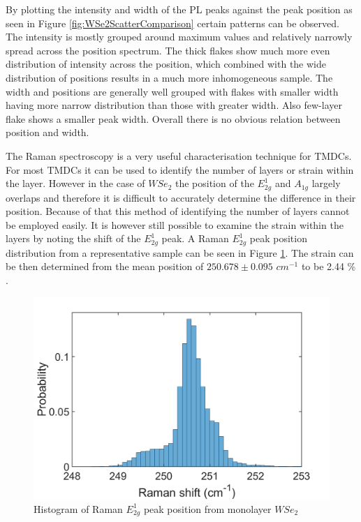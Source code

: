 By plotting the intensity and width of the PL peaks against the peak position as seen in Figure \ref{fig:WSe2ScatterComparison} certain patterns can be observed. The intensity is mostly grouped around maximum values and relatively narrowly spread across the position spectrum. The thick flakes show much more even distribution of intensity across the position, which combined with the wide distribution of positions results in a much more inhomogeneous sample.  The width and positions are generally well grouped with flakes with smaller width having more narrow distribution than those with greater width. Also few-layer flake shows a smaller peak width. Overall there is no obvious relation between position and width. 


The Raman spectroscopy is a very useful characterisation technique for TMDCs. For most TMDCs it can be used to identify the number of layers or strain within the layer. However in the case of $WSe_2$ the position of the $E^1_{2g}$ and $A_{1g}$ largely overlaps and therefore it is difficult to accurately determine the difference in their position. Because of that this method of identifying the number of layers cannot be employed easily. It is however still possible to examine the strain within the layers by noting the shift of the $E^1_{2g}$ peak. A Raman $E^1_{2g}$ peak position distribution from a representative sample can be seen in Figure \ref{fig:WSe2RamanPositionHistogram1}. The strain can be then determined from the mean position of $250.678 \pm 0.095$ $cm^{-1}$ to be 2.44 {\%} \cite{Dadgar2018}.

\begin{figure}[!h]
	\begin{center}
		\includegraphics[scale=0.3]{WSe2/WSe2RamanPositionHistogram1.png}
		\caption{Histogram of Raman $E^1_{2g}$ peak position from monolayer $WSe_2$}
		\label{fig:WSe2RamanPositionHistogram1}
	\end{center}
\end{figure}

